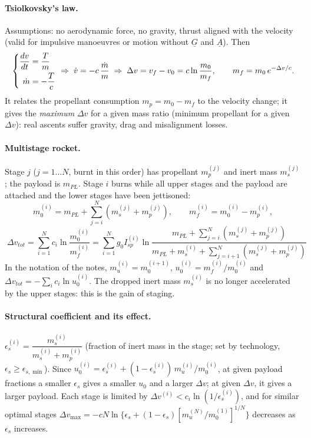 \paragraph{Tsiolkovsky's law.} Assumptions: no aerodynamic force, no gravity, thrust aligned with the velocity (valid for
impulsive manoeuvres or motion without $\underline G$ and $\underline A$). Then
\begin{equation}
\left\{\begin{aligned}\frac{dv}{dt}&=\frac{T}{m}\\ \dot m&=-\frac{T}{c}\end{aligned}\right.\;\Rightarrow\;\dot v=-c\,\frac{\dot m}{m}
\;\Rightarrow\;\Delta v=v_f-v_0=c\ln\frac{m_0}{m_f},\qquad m_f=m_0\,e^{-\Delta v/c}.
\end{equation}
It relates the propellant consumption $m_p=m_0-m_f$ to the velocity change; it gives the \emph{maximum} $\Delta v$ for a given
mass ratio (minimum propellant for a given $\Delta v$): real ascents suffer gravity, drag and misalignment losses.

\paragraph{Multistage rocket.} Stage $j$ ($j=1\dots N$, burnt in this order) has propellant $m_p^{(j)}$ and inert mass $m_s^{(j)}$; the
payload is $m_{PL}$. Stage $i$ burns while all upper stages and the payload are attached and the lower stages have been jettisoned:
\begin{equation}
m_0^{(i)}=m_{PL}+\sum_{j=i}^{N}\left(m_s^{(j)}+m_p^{(j)}\right),\qquad m_f^{(i)}=m_0^{(i)}-m_p^{(i)},
\end{equation}
\begin{equation}
\boxed{\;\Delta v_{tot}=\sum_{i=1}^{N}c_i\ln\frac{m_0^{(i)}}{m_f^{(i)}}
=\sum_{i=1}^{N}g_0I_{sp}^{(i)}\ln\frac{m_{PL}+\sum_{j=i}^{N}\left(m_s^{(j)}+m_p^{(j)}\right)}{m_{PL}+m_s^{(i)}+\sum_{j=i+1}^{N}\left(m_s^{(j)}+m_p^{(j)}\right)}\;}
\end{equation}
In the notation of the notes, $m_u^{(i)}=m_0^{(i+1)}$, $u_0^{(i)}=m_f^{(i)}/m_0^{(i)}$ and $\Delta v_{tot}=-\sum_ic_i\ln u_0^{(i)}$.
The dropped inert mass $m_s^{(i)}$ is no longer accelerated by the upper stages: this is the gain of staging.

\paragraph{Structural coefficient and its effect.} $\epsilon_s^{(i)}=\dfrac{m_s^{(i)}}{m_s^{(i)}+m_p^{(i)}}$ (fraction of inert mass in
the stage; set by technology, $\epsilon_s\ge\epsilon_{s,\min}$). Since $u_0^{(i)}=\epsilon_s^{(i)}+(1-\epsilon_s^{(i)})\,m_u^{(i)}/m_0^{(i)}$, at
given payload fractions a smaller $\epsilon_s$ gives a smaller $u_0$ and a larger $\Delta v$; at given $\Delta v$, it gives a larger payload.
Each stage is limited by $\Delta v^{(i)}<c_i\ln(1/\epsilon_s^{(i)})$, and for similar optimal stages
$\Delta v_{\max}=-cN\ln\{\epsilon_s+(1-\epsilon_s)[m_u^{(N)}/m_0^{(1)}]^{1/N}\}$ decreases as $\epsilon_s$ increases.

